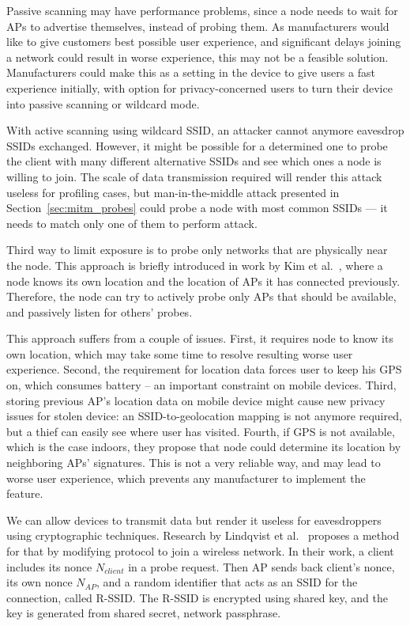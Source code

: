 \documentclass[12pt,a4paper,oneside,pdftex]{report}
\begin{document}
Passive scanning may have performance problems, since a node needs to wait for APs to advertise themselves, instead of probing them. As manufacturers would like to give customers best possible user experience, and significant delays joining a network could result in worse experience, this may not be a feasible solution. Manufacturers could make this as a setting in the device to give users a fast experience initially, with option for privacy-concerned users to turn their device into passive scanning or wildcard mode.

With active scanning using wildcard SSID, an attacker cannot anymore eavesdrop SSIDs exchanged. However, it might be possible for a determined one to probe the client with many different alternative SSIDs and see which ones a node is willing to join. The scale of data transmission required will render this attack useless for profiling cases, but man-in-the-middle attack presented in Section~\ref{sec:mitm_probes} could probe a node with most common SSIDs --- it needs to match only one of them to perform attack.

Third way to limit exposure is to probe only networks that are physically near the node. This approach is briefly introduced in work by Kim et al.~\cite{kimposter}, where a node knows its own location and the location of APs it has connected previously. Therefore, the node can try to actively probe only APs that should be available, and passively listen for others' probes. 

This approach suffers from a couple of issues. First, it requires node to know its own location, which may take some time to resolve resulting worse user experience. Second, the requirement for location data forces user to keep his GPS on, which consumes battery -- an important constraint on mobile devices. Third, storing previous AP's location data on mobile device might cause new privacy issues for stolen device: an SSID-to-geolocation mapping is not anymore required, but a thief can easily see where user has visited. Fourth, if GPS is not available, which is the case indoors, they propose that node could determine its location by neighboring APs' signatures. This is not a very reliable way, and may lead to worse user experience, which prevents any manufacturer to implement the feature.

We can allow devices to transmit data but render it useless for eavesdroppers using cryptographic techniques. Research by Lindqvist et al.~\cite{lindqvist2009privacy} proposes a method for that by modifying protocol to join a wireless network. In their work, a client includes its nonce $N_{client}$ in a probe request. Then AP sends back client's nonce, its own nonce $N_{AP}$, and a random identifier that acts as an SSID for the connection, called R-SSID. The R-SSID is encrypted using shared key, and the key is generated from shared secret, network passphrase.
\end{document}

